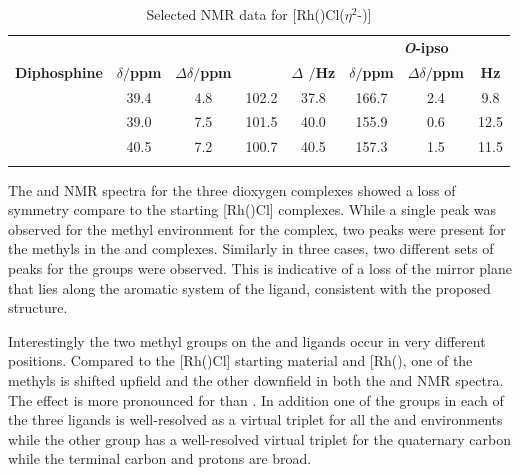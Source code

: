 \begin{table}[htbp]
\caption[Selected NMR data for [Rh(\tBuxantphosk)Cl($\eta^2$-){]}]{Selected NMR data for [Rh(\tBuxantphosk)Cl($\eta^2$-)]}
\vspace{1em}
\label{table:dioxygennmr}
\small
\begin{center}
\begin{tabular}{c c c c c c c c}
\toprule{}
	~~ & \multicolumn{4}{c}{\bfseries{\phosphorus}} & \multicolumn{3}{c}{\bfseries{\carbon{} \emph{O}-ipso}}\\
	\cmidrule(lr){2-5} \cmidrule(lr){6-8}
	\bfseries{Diphosphine}&\bfseries{$\delta/$ppm}&\bfseries{$\Delta\delta/$ppm}&\bfseries{\JRhP}&\bfseries{$\Delta$ \JRhP$/$Hz}&\bfseries{$\delta/$ppm}&\bfseries{$\Delta\delta/$ppm}&\bfseries{\J{} Hz} \\
	\midrule{}
	\tBuSixantphos 		& 39.4 & 4.8 & 102.2 & 37.8 & 166.7 & 2.4 & 9.8\\
	\tBuThixantphos 	& 39.0 & 7.5 & 101.5 & 40.0 & 155.9 & 0.6 & 12.5\\
	\tBuXantphos		& 40.5 & 7.2 & 100.7 & 40.5 & 157.3 & 1.5 & 11.5\\
	\bottomrule{}
\end{tabular}
\end{center} 
\end{table}

The \proton{} and \carbon{} NMR spectra for the three dioxygen complexes showed a loss of symmetry compare to the starting [Rh(\tBuxantphos)Cl] complexes.  While a single peak was observed for the methyl environment for the \tButhixantphos{} complex, two peaks were present for the methyls in the \tBusixantphos{} and \tBuxantphos{} complexes.  Similarly in three cases, two different sets of peaks for the \tBu{} groups were observed.  This is indicative of a loss of the mirror plane that lies along the aromatic system of the ligand, consistent with the proposed structure.  

Interestingly the two methyl groups on the \tBusixantphos{} and \tBuxantphos{} ligands occur in very different positions.  Compared to the [Rh(\tBuxantphosk)Cl] starting material and [Rh(\tBuxantphosk)\ce{(H)2Cl]}, one of the methyls is shifted upfield and the other downfield in both the \proton{} and \carbon{} NMR spectra.  The effect is more pronounced for \tBuxantphos{} than \tBusixantphos{}.  In addition one of the \tBu{} groups in each of the three \tBuxantphos{} ligands is well-resolved as a virtual triplet for all the \proton{} and \carbon{} environments while the other \tBu{} group has a well-resolved virtual triplet for the quaternary carbon while the terminal carbon and protons are broad.

